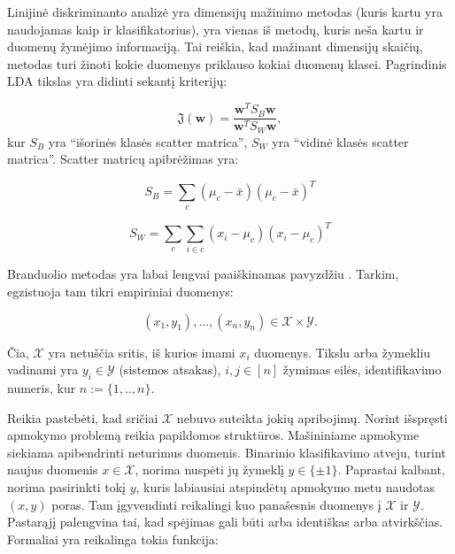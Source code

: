 \documentclass[]{vgtuef}
\begin{document}
Linijinė diskriminanto analizė yra dimensijų mažinimo metodas (kuris
kartu yra naudojamas kaip ir klasifikatorius), yra vienas iš metodų,
kuris neša kartu ir duomenų žymėjimo informaciją. Tai reiškia, kad
mažinant dimensijų skaičių, metodas turi žinoti kokie duomenys
priklauso kokiai duomenų klasei. Pagrindinis LDA tikslas yra didinti
sekantį kriterijų:

\begin{equation}
  \mathfrak{J}(\mathbf{w}) = \frac{ \mathbf{w}^T S_B \mathbf{w} }{
    \mathbf{w}^T S_W \mathbf{w} },
\end{equation}
kur $S_B$ yra ``išorinės klasės scatter matrica'', $S_W$ yra ``vidinė
klasės scatter matrica''. Scatter matricų apibrėžimas yra:

\begin{equation}
  S_B = \sum_c (\mu_c - \bar{x})(\mu_c - \bar{x})^T
\end{equation}

\begin{equation}
  S_W = \sum_c \sum_{i \in c} ( x_i - \mu_c)(x_i - \mu_c)^T
\end{equation}


Branduolio metodas yra labai lengvai paaiškinamas pavyzdžiu
\cite{2007math......1907H}. Tarkim, egzistuoja tam tikri empiriniai
duomenys:

\begin{equation}
  (x_1,y_1),...,(x_n,y_n) \in \mathcal{X} \times \mathcal{Y}.
\end{equation}

Čia, $\mathcal{X}$ yra netuščia sritis, iš kurios imami $x_i$
duomenys. Tikslu arba žymekliu vadinami yra $y_i \in \mathcal{Y}$
(sistemos atsakas), $i,j \in [n]$ žymimas eilės, identifikavimo
numeris, kur $n := \{1,..,n\}$.

Reikia pastebėti, kad sričiai $\mathcal{X}$ nebuvo suteikta jokių
apribojimų. Norint išspręsti apmokymo problemą reikia papildomos
struktūros. Mašininiame apmokyme siekiama apibendrinti neturimus
duomenis. Binarinio klasifikavimo atveju, turint naujus duomenis $x
\in \mathcal{X}$, norima nuspėti jų žymeklį $y \in \{\pm
1\}$. Paprastai kalbant, norima pasirinkti tokį $y$, kuris labiausiai
atspindėtų apmokymo metu naudotas $(x,y)$ poras. Tam įgyvendinti
reikalingi kuo panašesnis duomenys į $\mathcal{X}$ ir
$\mathcal{Y}$. Pastarąjį palengvina tai, kad spėjimas gali būti arba
identiškas arba atvirkščias. Formaliai yra reikalinga tokia funkcija:
\end{document}

